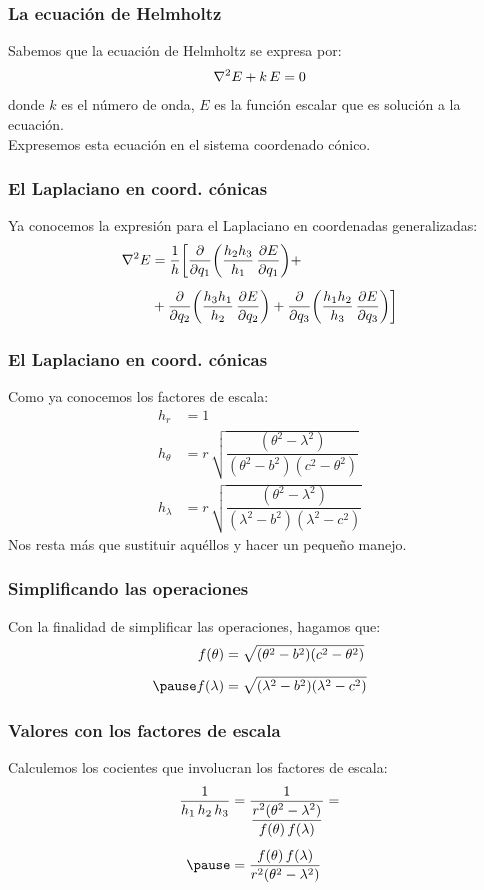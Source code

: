 \documentclass[12pt]{beamer}
\begin{document}
\begin{frame}
\frametitle{La ecuación de Helmholtz}
Sabemos que la ecuación de Helmholtz se expresa por:
\pause
\begin{align*}
\laplacian{E} + k \, E = 0
\end{align*}
donde $k$ es el número de onda, $E$ es la función escalar que es solución a la ecuación.
\\
\bigskip
\pause
Expresemos esta ecuación en el sistema coordenado cónico.
\end{frame}
\begin{frame}
\frametitle{El Laplaciano en coord. cónicas}
Ya conocemos la expresión para el Laplaciano en coordenadas generalizadas:
\pause
\begin{align*}
\laplacian{E} &= \dfrac{1}{h} \bigg[ \pdv{q_{1}} \bigg( \dfrac{h_{2} h_{3}}{h_{1}} \, \pdv{E}{q_{1}} \bigg) + \\[0.5em]
&+ \pdv{q_{2}} \bigg( \dfrac{h_{3} h_{1}}{h_{2}} \, \pdv{E}{q_{2}} \bigg) + \pdv{q_{3}} \bigg( \dfrac{h_{1} h_{2}}{h_{3}} \, \pdv{E}{q_{3}} \bigg) \bigg]
\end{align*}
\end{frame}
\begin{frame}
\frametitle{El Laplaciano en coord. cónicas}
Como ya conocemos los factores de escala:
\pause
\begin{align*}
h_{r} &= 1 \\[0.5em]
h_{\theta} &=  r \, \sqrt{\dfrac{(\theta^{2} - \lambda^{2})}{(\theta^{2} - b^{2})(c^{2} - \theta^{2})}} \\[0.5em]
h_{\lambda} &= r \, \sqrt{\dfrac{(\theta^{2} - \lambda^{2})}{(\lambda^{2} - b^{2})(\lambda^{2} - c^{2})}}
\end{align*}
Nos resta más que sustituir aquéllos y hacer un pequeño manejo.
\end{frame}
\begin{frame}
\frametitle{Simplificando las operaciones}
Con la finalidad de simplificar las operaciones, hagamos que:
\pause
\begin{eqnarray*}
\begin{aligned}
f(\theta) &= \sqrt{(\theta^{2} - b^{2})(c^{2} - \theta^{2})} \\[0.5em] \pause
f(\lambda) &= \sqrt{(\lambda^{2} - b^{2})(\lambda^{2} - c^{2})}
\end{aligned}
\end{eqnarray*}
\end{frame}
\begin{frame}
\frametitle{Valores con los factores de escala}
Calculemos los cocientes que involucran los factores de escala:
\pause
\begin{eqnarray*}
\begin{aligned}
\dfrac{1}{h_{1} \, h_{2} \, h_{3}} &= \dfrac{1}{\dfrac{r^{2} (\theta^{2} - \lambda^{2})}{f(\theta) \, f(\lambda)}} = \\[0.5em] \pause
&= \dfrac{f(\theta) \, f(\lambda)}{r^{2} (\theta^{2} - \lambda^{2})}
\end{aligned}
\end{eqnarray*}
\end{frame}
\end{document}
